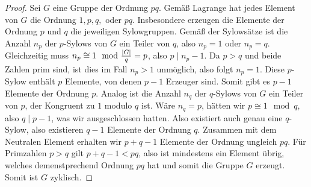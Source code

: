 \documentclass{article}
\begin{document}
		\begin{proof}
			Sei $G$ eine Gruppe der Ordnung $pq$. Gemäß Lagrange hat jedes Element von $G$ die Ordnung $1,p,q,$ oder $pq$. Insbesondere erzeugen die Elemente der Ordnung $p$ und $q$ die jeweiligen Sylowgruppen.
			\newpar
			Gemäß der Sylowsätze ist die Anzahl $n_p$ der $p$-Sylows von $G$ ein Teiler von $q$, also $n_p = 1$ oder $n_p = q$. Gleichzeitig muss $n_p \cong 1 \mod \frac{\abs{G}}{q} = p$, also $p \mid n_p - 1$. Da $p > q$ und beide Zahlen prim sind, ist dies im Fall $n_p > 1$ unmöglich, also folgt $n_p = 1$. Diese $p$-Sylow enthält $p$ Elemente, von denen $p-1$ Erzeuger sind. Somit gibt es $p-1$ Elemente der Ordnung $p$.
			\newpar
			Analog ist die Anzahl $n_q$ der $q$-Sylows von $G$ ein Teiler von $p$, der Kongruent zu $1$ modulo $q$ ist. Wäre $n_q = p$, hätten wir $p \cong 1 \mod q$, also $q \mid p-1$, was wir ausgeschlossen hatten. Also existiert auch genau eine $q$-Sylow, also existieren $q-1$ Elemente der Ordnung $q$.
			\newpar
			Zusammen mit dem Neutralen Element erhalten wir $p + q - 1$ Elemente der Ordnung ungleich $pq$. Für Primzahlen $p > q$ gilt $p + q - 1 < pq$, also ist mindestens ein Element übrig, welches demenstprechend Ordnung $pq$ hat und somit die Gruppe $G$ erzeugt. Somit ist $G$ zyklisch.
		\end{proof}
	\clearpage
\end{document}
